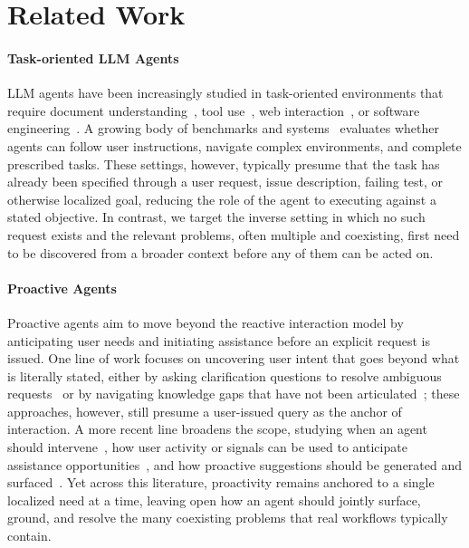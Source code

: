 \section{Related Work}

\paragraph{Task-oriented LLM Agents}
LLM agents have been increasingly studied in task-oriented environments that require document understanding~\cite{mmlongbench_doc}, tool use~\cite{Toolformer, ToolLLM}, web interaction~\cite{WebArena, Mind2Web}, or software engineering~\cite{SWE-agent, AutoCodeRover}. A growing body of benchmarks and systems~\cite{AgentBench, OSWorld} evaluates whether agents can follow user instructions, navigate complex environments, and complete prescribed tasks. These settings, however, typically presume that the task has already been specified through a user request, issue description, failing test, or otherwise localized goal, reducing the role of the agent to executing against a stated objective. In contrast, we target the inverse setting in which no such request exists and the relevant problems, often multiple and coexisting, first need to be discovered from a broader context before any of them can be acted on.

\paragraph{Proactive Agents}
Proactive agents aim to move beyond the reactive interaction model by anticipating user needs and initiating assistance before an explicit request is issued. One line of work focuses on uncovering user intent that goes beyond what is literally stated, either by asking clarification questions to resolve ambiguous requests~\cite{DBLP:conf/sigir/AliannejadiZCC19, Kuhn2022CLAMSC, DBLP:conf/emnlp/Zhang0RNC24, DBLP:journals/corr/abs-2511-02208, DiscoverLLM} or by navigating knowledge gaps that have not been articulated~\cite{proper}; these approaches, however, still presume a user-issued query as the anchor of interaction. A more recent line broadens the scope, studying when an agent should intervene~\cite{DBLP:conf/chi/LiuFSWIC25, DBLP:conf/emnlp/ZhangDLMKDCM25}, how user activity or signals can be used to anticipate assistance opportunities~\cite{ProactiveAgent, ContextAgent, FingerTip20K}, and how proactive suggestions should be generated and surfaced~\cite{probe}. Yet across this literature, proactivity remains anchored to a single localized need at a time, leaving open how an agent should jointly surface, ground, and resolve the many coexisting problems that real workflows typically contain.

